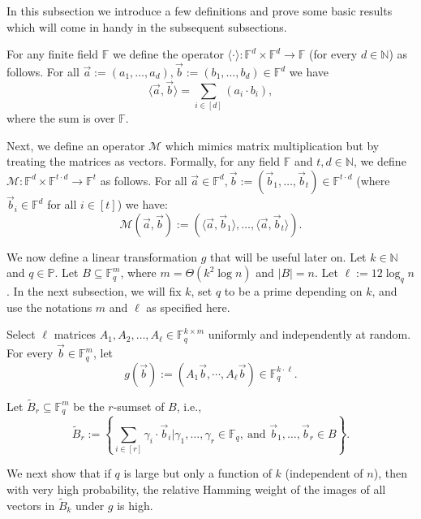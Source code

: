\documentclass[11pt]{article}
\newcommand{\F}{\mathbb{F}}
\renewcommand{\tilde}{\widetilde}
\newcommand{\M}{\mathcal{M}}
\begin{document}
  In this subsection we introduce a few definitions and prove some basic results which will come in handy in the subsequent subsections. 


For any finite field $\F$ we define the operator $\langle\cdot \rangle:\F^d\times \F^d\to \F$ (for every $d\in\mathbb{N}$) as follows. For all $\vec{a}:=(a_1,\ldots,a_d),\vec{b}:=(b_1,\ldots,b_d)\in\F^d$ we have $$
 \langle \vec{a},\vec{b}\rangle=\sum_{i\in[d]}\left(a_i\cdot b_i\right),
$$
where the sum is over $\F$. 

Next, we define an operator $\M$ which mimics matrix multiplication but by treating the matrices as vectors. Formally, for any field $\F$ and  $t,d\in\mathbb{N}$, we define $\M:\F^{d}\times \F^{t\cdot d}\to \F^t$ as follows. For all $\vec{a}\in \F^d,\vec{b}:=(\vec{b}_1,\ldots,\vec{b}_{t})\in\F^{t\cdot d}$ (where $\vec{b}_i\in\F^d$ for all $i\in[t]$) we have:
$$
\M(\vec{a},\vec{b}):=\left(\langle \vec{a},\vec{b}_1\rangle,\ldots ,\langle \vec{a},\vec{b}_t\rangle\right).
$$



 


We now define a linear transformation $g$ that will be useful later on. 
Let $k\in\mathbb{N}$ and $q\in\mathbb{P}$. Let $B\subseteq \F_q^m$, where $m=\Theta(k^2\log n)$ and $|B|=n$.  Let $\ell:=12\log_q n$. In the next subsection, we will fix $k$, set $q$ to be a prime depending on $k$, and use the notations $m$ and  $\ell$ as specified here. 


Select $\ell$ matrices $A_1,A_2,\ldots,A_\ell\in \mathbb{F}_q^{k\times m}$ uniformly and independently at random. For every  $\vec{b}\in \mathbb{F}_q^m$, let  
\[
g(\vec{b}):=(A_1\vec{b},\cdots,A_\ell\vec{b})\in\mathbb{F}_q^{k\cdot \ell}.
\]
 

   Let $\tilde{B}_r\subseteq \F_q^m$ be the $r$-sumset of $B$, i.e., $$\tilde{B}_r:=\left\{\sum_{i\in[r]}\gamma_i\cdot \vec{b}_i\bigg| \gamma_1,\ldots ,\gamma_r\in\F_q,\ \text{and }\vec{b}_1,\ldots,\vec{b}_r\in B\right\}.$$
   
   We next show that if $q$ is large but only a function of $k$ (independent of $n$), then with very high probability, the relative Hamming weight of the images of all vectors in $\tilde{B}_k$ under $g$ is high. 
  
\end{document}
